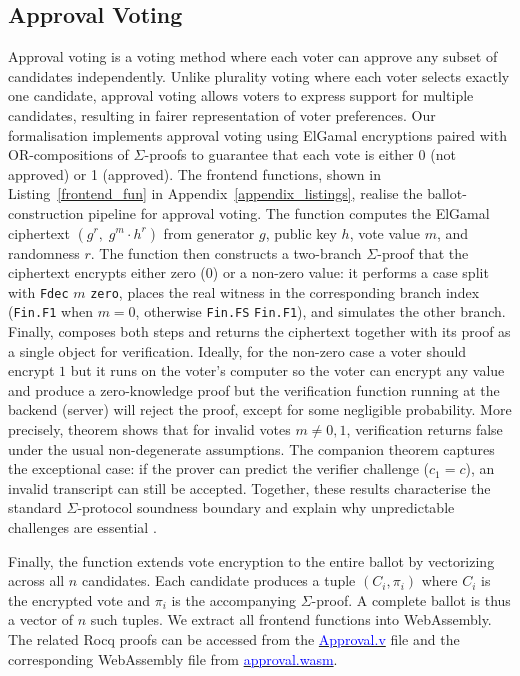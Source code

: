\documentclass[sigconf,anonymous,review]{acmart}
\begin{document}
\subsection{Approval Voting}
Approval voting is a voting method where each voter can approve any subset of candidates independently. 
Unlike plurality voting where each voter selects exactly one candidate, approval voting allows voters to express 
support for multiple candidates, resulting in fairer representation of voter preferences. Our formalisation 
implements approval voting using ElGamal encryptions paired with OR-compositions of $\Sigma$-proofs to guarantee that 
each vote is either 0 (not approved) or 1 (approved).  The frontend functions, shown in Listing~\ref{frontend_fun} in Appendix~\ref{appendix_listings}, realise the ballot-construction pipeline for approval voting. The function \texttt{} computes the ElGamal ciphertext $(g^r,\; g^m \cdot h^r)$ from generator $g$, public key $h$, vote value $m$, and randomness $r$. The function \texttt{} then constructs a two-branch $\Sigma$-proof that the ciphertext encrypts either zero ($0$) or a non-zero value: it performs a case split with \texttt{Fdec} $m$ \texttt{zero}, places the real witness in the corresponding branch index (\texttt{Fin.F1} when $m=0$, otherwise \texttt{Fin.FS} \texttt{Fin.F1}), and simulates the other branch. Finally, \texttt{} composes both steps and returns the ciphertext together with its proof as a single object for verification. Ideally, for the non-zero case a voter should encrypt $1$ but it runs on the voter's computer so the voter can encrypt any value and produce a zero-knowledge proof but the verification function running at the backend (server) will reject the proof, except for some negligible probability. More precisely, theorem \texttt{} shows that for invalid votes $m \neq 0,1$, verification returns false under the usual non-degenerate assumptions. The companion theorem \texttt{} captures the exceptional case: if the prover can predict the verifier challenge ($c_1 = c$), an invalid transcript can still be accepted. Together, these results characterise the standard $\Sigma$-protocol soundness boundary and explain why unpredictable challenges are essential \cite{10.1007/978-3-642-34961-4_38,dao2023weak}. 

Finally, the function \texttt{} extends vote encryption to the entire ballot by vectorizing across all $n$ candidates. Each candidate 
produces a tuple $(C_i, \pi_i)$ where $C_i$ is the encrypted vote and $\pi_i$ is the accompanying $\Sigma$-proof. A complete ballot is thus a vector of $n$ such tuples. We extract all frontend functions into WebAssembly. The related Rocq proofs can be accessed from the \href{https://anonymous.4open.science/r/SigmaProtocol-EBA5/src/Frontend/Approval.v}{\textcolor{blue}{Approval.v}} file and the corresponding WebAssembly file from \href{https://anonymous.4open.science/r/SigmaProtocol-EBA5/src/Wasm/approval.wasm}{\textcolor{blue}{approval.wasm}}.
\end{document}

